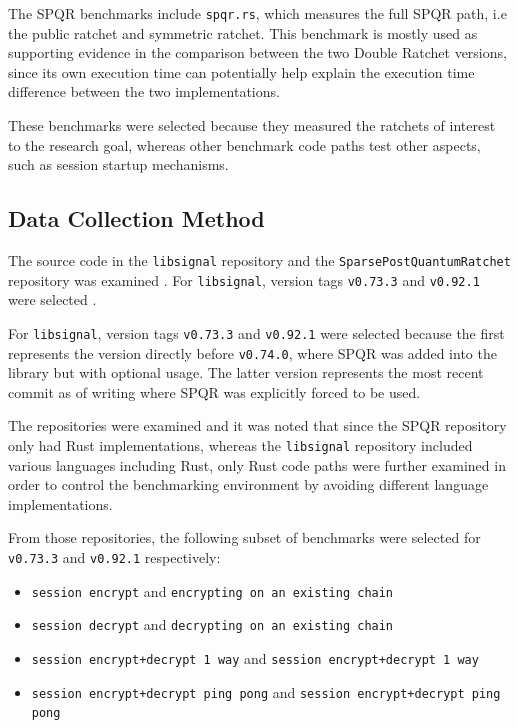 The SPQR benchmarks include \texttt{spqr.rs}, which measures the full SPQR path, i.e the public ratchet and symmetric ratchet. This benchmark is mostly used as supporting evidence in the comparison between the two Double Ratchet versions, since its own execution time can potentially help explain the execution time difference between the two implementations.

These benchmarks were selected because they measured the ratchets of interest to the research goal, whereas other benchmark code paths test other aspects, such as session startup mechanisms.

\subsection{Data Collection Method}

The source code in the \texttt{libsignal} repository and the \texttt{SparsePostQuantumRatchet} repository was examined \cite{signalSPQR}. For \texttt{libsignal}, version tags \texttt{v0.73.3} and \texttt{v0.92.1} were selected \cite{signalLibsignal0733,signalLibsignal0921}.


For \texttt{libsignal}, version tags \texttt{v0.73.3} and \texttt{v0.92.1} were selected because the first represents the version directly before \texttt{v0.74.0}, where SPQR was added into the library but with optional usage.  The latter version represents the most recent commit as of writing where SPQR was explicitly forced to be used. 

The repositories were examined and it was noted that since the SPQR repository only had Rust implementations, whereas the \texttt{libsignal} repository included various languages including Rust, only Rust code paths were further examined in order to control the benchmarking environment by avoiding different language implementations.

From those repositories, the following subset of benchmarks were selected for \texttt{v0.73.3} and \texttt{v0.92.1} respectively:

\begin{itemize}
    \item \texttt{session encrypt} and \texttt{encrypting on an existing chain}
    \item \texttt{session decrypt} and \texttt{decrypting on an existing chain}
    \item \texttt{session encrypt+decrypt 1 way} and \texttt{session encrypt+decrypt 1 way}
    \item \texttt{session encrypt+decrypt ping pong} and \texttt{session encrypt+decrypt ping pong}
\end{itemize}

